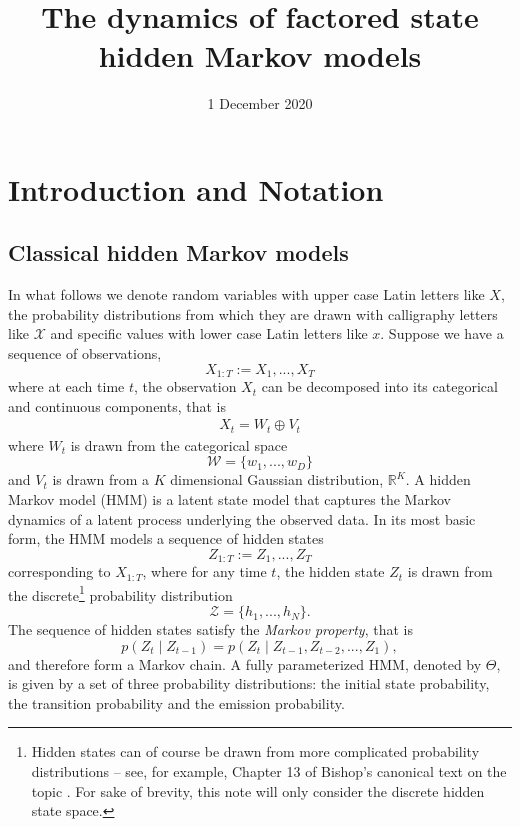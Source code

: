 \documentclass{amsart}
\title{The dynamics of factored state hidden Markov models}
\date{1 December 2020}
\begin{document}
\maketitle

\section{Introduction and Notation}\label{sec:intro}

\subsection{Classical hidden Markov models}
In what follows we denote random variables with upper case Latin letters like 
$X$, the probability distributions from which they are drawn with calligraphy 
letters like $\mathcal X$ and specific values with lower case Latin letters like $x$.  Suppose we have a sequence of observations, 
\[
X_{1:T} := X_1,...,X_T
\]
where at each time $t$, the observation $X_t$ can be decomposed into its 
categorical and continuous components, that is 
\begin{eqnarray}\label{eqn:decomposition}
X_t = W_t\oplus V_t
\end{eqnarray}
where $W_{t}$ is drawn from the categorical space
\[ 
\mathcal W = \{w_1,...,w_D\}
\]
and $V_t$ is drawn from a $K$ dimensional Gaussian distribution, $\mathbb R^K$.
A hidden Markov model (HMM) is a latent state model that captures the Markov dynamics of a latent process underlying the observed data.  In its most basic form, the HMM models a sequence of hidden states
\[
Z_{1:T} := Z_1,...,Z_T
\]
corresponding to $X_{1:T}$, where for any time $t$, the hidden state $Z_t$ is 
drawn from the discrete\footnote{Hidden states can of course be drawn from more complicated probability 
distributions -- see, for example, Chapter 13 of Bishop's canonical text on the 
topic \cite{B06}.  For sake of brevity, this note will only 
consider the discrete hidden state space.} probability distribution
\[
\mathcal{Z} = \{h_1,...,h_N\}.
\]
The sequence of hidden states satisfy the {\em Markov property}, that is 
\[
p(Z_t\mid Z_{t-1})=p(Z_t\mid Z_{t-1},Z_{t-2},...,Z_1),
\]
and therefore form a Markov chain.  A fully parameterized HMM, denoted by 
$\Theta$, is given by a set of three probability distributions: the initial state probability, the transition probability and the 
emission probability.
\end{document}
